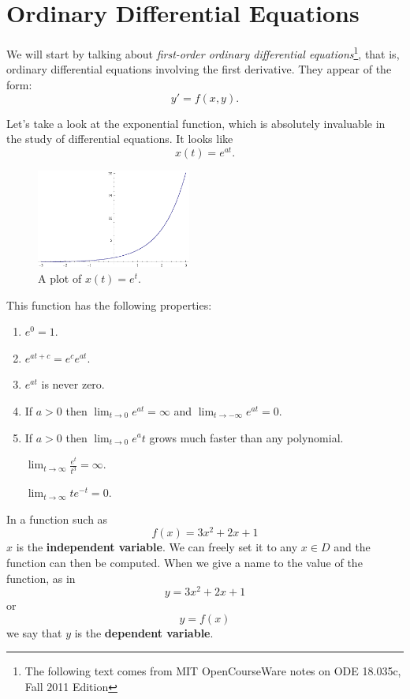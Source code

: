 \chapter{Ordinary Differential Equations}
We will start by talking about {\em first-order ordinary differential equations}\footnote{The following text comes from MIT OpenCourseWare notes on ODE 18.035c, Fall 2011 Edition},
that is, ordinary differential equations involving the first derivative.
They appear of the form:
\begin{equation}
  y'=f(x,y).
  \label{eq:fode}
\end{equation}

Let's take a look at the exponential function, which is absolutely invaluable in the study of differential equations.
It looks like
\[ x(t)=e^{at}. \]
\begin{figure}[H]
  \begin{center}
    \includegraphics[width=2in]{continuous/ode/ept.eps}
  \end{center}
  \caption{A plot of $x(t)=e^t$.}
  \label{fig:plotept}
\end{figure}
This function has the following properties:
\begin{enumerate}
  \item $e^0 =1$.
  \item $e^{at+c} = e^c e^{at}$.
  \item $e^{at}$ is never zero.
  \item If $a>0$ then $\lim_{t\to 0} e^{at} = \infty$ and $\lim_{t\to -\infty} e^{at}=0$.
  \item If $a>0$ then $\lim_{t\to 0} e^at$ grows much faster than any polynomial.
    \begin{ex}
      $\lim_{t\to\infty} \frac{e^t}{t^3}=\infty$.
    \end{ex}
    \begin{ex}
      $\lim_{t\to\infty}te^{-t}=0.$
    \end{ex}
\end{enumerate}

In a function such as
\[ f(x)=3x^2+2x+1 \]
$x$ is the \textbf{independent variable}.
We can freely set it to any $x \in D$ and the function can then be computed.
When we give a name to the value of the function, as in
\[ y=3x^2 +2x +1 \]
or
\[y=f(x) \]
we say that $y$ is the \textbf{dependent variable}.


